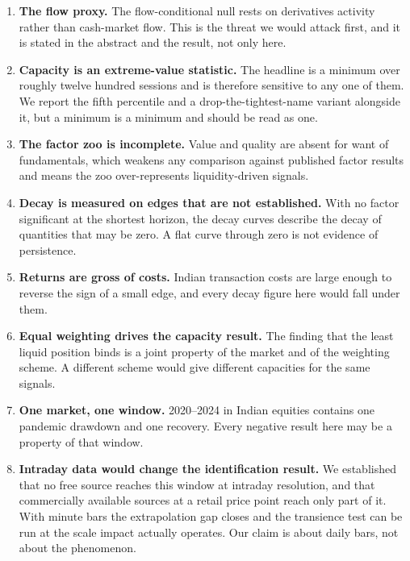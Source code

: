 \documentclass[11pt,a4paper]{article}
\begin{document}
\begin{enumerate}
\item \textbf{The flow proxy.} The flow-conditional null rests on derivatives activity rather than
cash-market flow. This is the threat we would attack first, and it is stated in the abstract and
the result, not only here.

\item \textbf{Capacity is an extreme-value statistic.} The headline is a minimum over roughly twelve
hundred sessions and is therefore sensitive to any one of them. We report the fifth percentile and a
drop-the-tightest-name variant alongside it, but a minimum is a minimum and should be read as one.

\item \textbf{The factor zoo is incomplete.} Value and quality are absent for want of fundamentals,
which weakens any comparison against published factor results and means the zoo over-represents
liquidity-driven signals.

\item \textbf{Decay is measured on edges that are not established.} With no factor significant at
the shortest horizon, the decay curves describe the decay of quantities that may be zero. A flat
curve through zero is not evidence of persistence.

\item \textbf{Returns are gross of costs.} Indian transaction costs are large enough to reverse the
sign of a small edge, and every decay figure here would fall under them.

\item \textbf{Equal weighting drives the capacity result.} The finding that the least liquid
position binds is a joint property of the market and of the weighting scheme. A different scheme
would give different capacities for the same signals.

\item \textbf{One market, one window.} 2020--2024 in Indian equities contains one pandemic
drawdown and one recovery. Every negative result here may be a property of that window.

\item \textbf{Intraday data would change the identification result.} We established that no free
source reaches this window at intraday resolution, and that commercially available sources at a
retail price point reach only part of it. With minute bars the extrapolation gap closes and the
transience test can be run at the scale impact actually operates. Our claim is about daily bars, not
about the phenomenon.
\end{enumerate}
\end{document}
